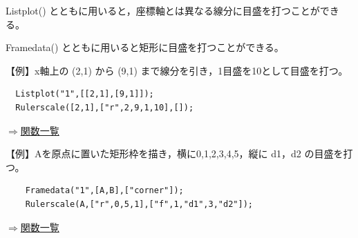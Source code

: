 \documentclass[papersize,a4paper,12pt,uplatex]{jsarticle}
\begin{document}
\begin{description}
  Listplot() とともに用いると，座標軸とは異なる線分に目盛を打つことができる。
  
  Framedata() とともに用いると矩形に目盛を打つことができる。
  
\vspace{\baselineskip}
【例】x軸上の (2,1) から (9,1) まで線分を引き，1目盛を10として目盛を打つ。
\begin{verbatim}
  Listplot("1",[[2,1],[9,1]]);
  Rulerscale([2,1],["r",2,9,1,10],[]);
\end{verbatim}  
      \begin{center}  \end{center}
\vspace{\baselineskip}
\begin{flushright}  \hyperlink{functionlist}{$\Rightarrow$関数一覧}\end{flushright}

【例】Aを原点に置いた矩形枠を描き，横に0,1,2,3,4,5，縦に d1，d2 の目盛を打つ。
\begin{verbatim}
    Framedata("1",[A,B],["corner"]);
    Rulerscale(A,["r",0,5,1],["f",1,"d1",3,"d2"]);
\end{verbatim}  
      \begin{center}  \end{center}
\vspace{\baselineskip}
\begin{flushright}  \hyperlink{functionlist}{$\Rightarrow$関数一覧}\end{flushright}

\end{description}
\newpage
\end{document}
